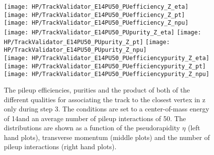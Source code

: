 \begin{figure}[!h]
  \centering
  \texttt{[image: HP/TrackValidator\_E14PU50\_PUefficiency\_Z\_eta]}
  \texttt{[image: HP/TrackValidator\_E14PU50\_PUefficiency\_Z\_pt]}
  \texttt{[image: HP/TrackValidator\_E14PU50\_PUefficiency\_Z\_npu]}
   \\
  \texttt{[image: HP/TrackValidator\_E14PU50\_PUpurity\_Z\_eta]}
  \texttt{[image: HP/TrackValidator\_E14PU50\_PUpurity\_Z\_pt]}
  \texttt{[image: HP/TrackValidator\_E14PU50\_PUpurity\_Z\_npu]}
   \\
  \texttt{[image: HP/TrackValidator\_E14PU50\_PUefficiencypurity\_Z\_eta]}
  \texttt{[image: HP/TrackValidator\_E14PU50\_PUefficiencypurity\_Z\_pt]}
  \texttt{[image: HP/TrackValidator\_E14PU50\_PUefficiencypurity\_Z\_npu]}
  \caption[Pileup efficiencies, purities and their product of the different qualities of the association map with associating the track to the closest vertex in z only during step 3 with 14\TeV and $\left<PU\right>=50$]{The pileup efficiencies, purities and the product of both of the different qualities for associating the track to the closest vertex in z only during step 3. The conditions are set to a center-of-mass energy of 14\TeV and an average number of pileup interactions of 50. The distributions are shown as a function of the pseudorapidity $\eta$ (left hand plots), transverse momentum (middle plots) and the number of pileup interactions (right hand plots).}
\end{figure}
\clearpage

